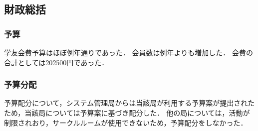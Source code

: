 \subsection*{財政総括}



\subsubsection*{予算}
学友会費予算はほぼ例年通りであった．
会員数は例年よりも増加した． 
会費の合計としては202500円であった．

\subsubsection*{予算分配}
予算配分について，システム管理局からは当該局が利用する予算案が提出されたため，当該局については予算案に基づき配分した．
他の局については，活動が制限されおり，サークルルームが使用できないため，予算配分をしなかった．
